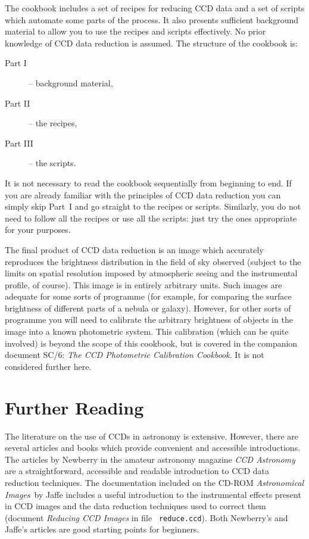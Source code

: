 \documentclass[twoside,11pt]{article}
\newcommand{\xref}[3]{#1}
\newcommand{\xlabel}[1]{}
\begin{document}
The cookbook includes a set of recipes for reducing CCD data and a set
of scripts which automate some parts of the process.  It also presents
sufficient background material to allow you to use the recipes and scripts
effectively.  No prior knowledge of CCD data reduction is assumed.  The
structure of the cookbook is:

\begin{description}

  \item[{\rm Part I}] -- background material,

  \item[{\rm Part II}] -- the recipes,

  \item[{\rm Part III}] -- the scripts.

\end{description}

It is not necessary to read the cookbook sequentially from beginning
to end.  If you are already familiar with the principles of CCD data
reduction you can simply skip Part~I and go straight to the recipes or
scripts.  Similarly, you do not need to follow all the recipes or use all
the scripts: just try the ones appropriate for your purposes.

The final product of CCD data reduction is an image which accurately
reproduces the brightness distribution in the field of sky observed
(subject to the limits on spatial resolution imposed by atmospheric
seeing and the instrumental profile, of course).  This image is in entirely
arbitrary units.  Such images are adequate for some sorts of programme
(for example, for comparing the surface brightness of different parts of
a nebula or galaxy).  However, for other sorts of programme you will need
to calibrate the arbitrary brightness of objects in the image into a known
photometric system.  This calibration (which can be quite involved) is
beyond the scope of this cookbook, but is covered in the companion document
\xref{SC/6: {\it The CCD Photometric Calibration Cookbook}}{sc6}{}\/\cite{SC6}.
It is not considered further here.


\section{\xlabel{FURTHER}\label{FURTHER}Further Reading}

The literature on the use of CCDs in astronomy is extensive.  However,
there are several articles and books which provide convenient and accessible
introductions.  The articles by Newberry\cite{NEWBERRY95A, NEWBERRY95B,
NEWBERRY96} in the amateur astronomy magazine {\it CCD Astronomy}\, are a
straightforward, accessible and readable introduction to CCD data reduction
techniques.  The documentation included on the CD-ROM {\it Astronomical
Images}\, by Jaffe\cite{JAFFE98} includes a useful introduction to the
instrumental effects present in CCD images and the data reduction techniques
used to correct them (document {\it Reducing CCD Images}\/ in file {\tt
reduce.ccd}).  Both Newberry's and Jaffe's articles are good starting
points for beginners.
\end{document}
